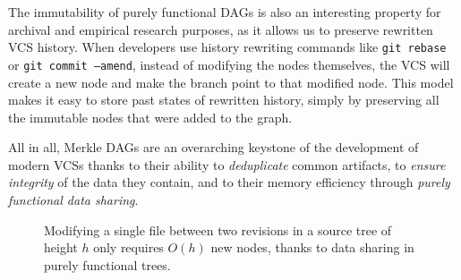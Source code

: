 The immutability of purely functional \glspl{DAG} is also an interesting
property for archival and empirical research purposes, as it allows us to
preserve rewritten \gls{VCS} history. When developers use history rewriting
commands like \texttt{git rebase} or \texttt{git commit --amend}, instead of
modifying the nodes themselves, the \gls{VCS} will create a new node and make
the branch point to that modified node. This model makes it easy to store
past states of rewritten history, simply by preserving all the immutable nodes
that were added to the graph.

All in all, Merkle \glspl{DAG} are an overarching keystone of the development
of modern \glspl{VCS} thanks to their ability to \emph{deduplicate} common
artifacts, to \emph{ensure integrity} of the data they contain, and to their
memory efficiency through \emph{purely functional data sharing}.

\begin{figure}
    \centering
    
    \caption{Modifying a single file between two revisions in a source tree of
    height $h$ only requires $O(h)$ new nodes, thanks to data sharing in purely
    functional trees.}%
    \label{fig:okasaki-complexity}
\end{figure}
